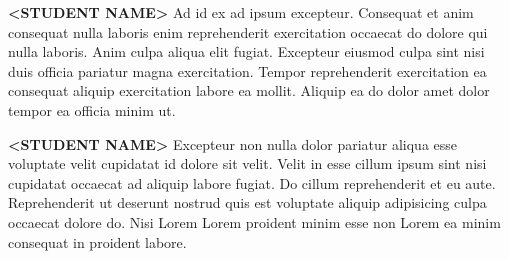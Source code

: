 \begin{bionote}

  \vspace{1cm}

  \begin{figure}
    \centering
    \vspace{-15pt}
    \setlength{\fboxsep}{2pt}
    \setlength{\fboxrule}{1pt}
  \end{figure}\par
  \textbf{<STUDENT NAME>} Ad id ex ad ipsum excepteur. Consequat et anim consequat nulla laboris enim reprehenderit exercitation occaecat do dolore qui nulla laboris. Anim culpa aliqua elit fugiat. Excepteur eiusmod culpa sint nisi duis officia pariatur magna exercitation. Tempor reprehenderit exercitation ea consequat aliquip exercitation labore ea mollit. Aliquip ea do dolor amet dolor tempor ea officia minim ut.

  \vspace{3cm}

  \begin{figure}
    \centering
    \setlength{\fboxsep}{2pt}
    \setlength{\fboxrule}{1pt}
  \end{figure}\par
  \textbf{<STUDENT NAME>} Excepteur non nulla dolor pariatur aliqua esse voluptate velit cupidatat id dolore sit velit. Velit in esse cillum ipsum sint nisi cupidatat occaecat ad aliquip labore fugiat. Do cillum reprehenderit et eu aute. Reprehenderit ut deserunt nostrud quis est voluptate aliquip adipisicing culpa occaecat dolore do. Nisi Lorem Lorem proident minim esse non Lorem ea minim consequat in proident labore.

\end{bionote}
